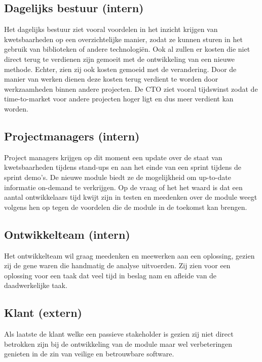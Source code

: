 \subsection{Dagelijks bestuur (intern)}\label{subsec:dagelijks-bestuur-(intern)}
Het dagelijks bestuur ziet vooral voordelen in het inzicht krijgen van kwetsbaarheden op een overzichtelijke manier, zodat ze kunnen sturen in het gebruik van biblioteken of andere technologiën. Ook al zullen er kosten die niet direct terug te verdienen zijn gemoeit met de ontwikkeling van een nieuwe methode.
Echter, zien zij ook kosten gemoeid met de verandering.
Door de manier van werken dienen deze kosten terug verdient te worden door werkzaamheden binnen andere projecten.
De CTO ziet vooral tijdswinst zodat de time-to-market voor andere projecten hoger ligt en dus meer verdient kan worden.
\subsection{Projectmanagers (intern)}\label{subsec:projectmanagers-(intern)}
Project managers krijgen op dit moment een update over de staat van kwetsbaarheden tijdens stand-ups en aan het einde van een sprint tijdens de sprint demo's.
De nieuwe module biedt ze de mogelijkheid om up-to-date informatie on-demand te verkrijgen.
Op de vraag of het het waard is dat een aantal ontwikkelaars tijd kwijt zijn in testen en meedenken over de module weegt volgens hen op tegen de voordelen die de module in de toekomst kan brengen.
\subsection{Ontwikkelteam (intern)}\label{subsec:ontwikkelteam-(intern)}
Het ontwikkelteam wil graag meedenken en meewerken aan een oplossing, gezien zij de gene waren die handmatig de analyse uitvoerden.
Zij zien voor een oplossing voor een taak dat veel tijd in beslag nam en afleide van de daadwerkelijke taak.
\subsection{Klant (extern)}\label{subsec:klant-(extern)}
Als laatste de klant welke een passieve stakeholder is gezien zij niet direct betrokken zijn bij de ontwikkeling van de module maar wel verbeteringen genieten in de zin van veilige en betrouwbare software.
